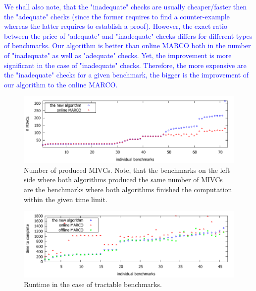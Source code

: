 \textcolor{blue}{We shall also note, that the "inadequate" checks are usually cheaper/faster then the "adequate" checks (since the former requires to find a counter-example whereas the latter requires to establish a proof). However, the exact ratio between the price of "adequate" and "inadequate" checks differs for different types of benchmarks. Our algorithm is better than online MARCO both in the number of "inadequate" as well as "adequate" checks. Yet, the improvement is more significant in the case of "inadequate" checks. Therefore, the more expensive are the "inadequate" checks for a given benchmark, the bigger is the improvement of our algorithm to the online MARCO.   }

\begin{figure}[!t]
\centering
\includegraphics[scale=0.8]{./plots/found_mivcs.pdf}
\caption{Number of produced MIVCs. Note, that the benchmarks on the left side where both algorithms produced the same number of MIVCs are the benchmarks where both algorithms finished the computation within the given time limit.}
\label{res:found_mivcs}
\end{figure}

\begin{figure}[!t]
\centering
\includegraphics[scale=0.8]{./plots/time_to_complete.pdf}
\caption{Runtime in the case of tractable benchmarks.}
\label{res:time_to_complete}
\end{figure}

